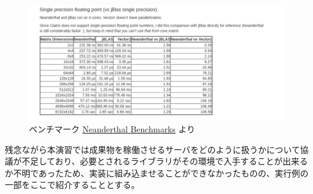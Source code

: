 \documentclass{scrartcl}
\begin{document}
\begin{figure}[htbp]
\centering
\includegraphics[width=.9\linewidth]{./neanderthal.png}
\caption{ベンチマーク \href{http://neanderthal.uncomplicate.org/articles/benchmarks.html}{Neanderthal Benchmarks} より}
\end{figure}

\newpage
残念ながら本演習では成果物を稼働させるサーバをどのように扱うかについて協議が不足しており、必要とされるライブラリがその環境で入手することが出来るか不明であったため、実装に組み込ませることができなかったものの、実行例の一部をここで紹介することとする。\\
\end{document}
